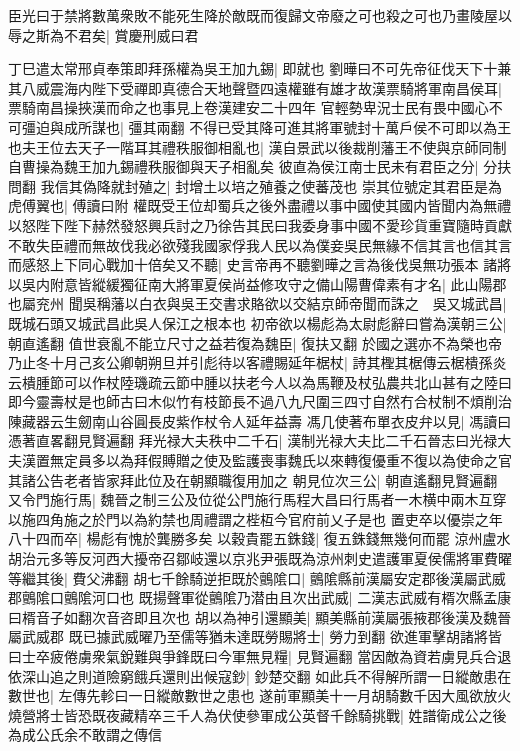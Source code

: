 臣光曰于禁將數萬衆敗不能死生降於敵既而復歸文帝廢之可也殺之可也乃畫陵屋以辱之斯為不君矣|{
	賞慶刑威曰君}


丁巳遣太常邢貞奉策即拜孫權為吳王加九錫|{
	即就也}
劉曄曰不可先帝征伐天下十兼其八威震海内陛下受禪即真德合天地聲暨四遠權雖有雄才故漢票騎將軍南昌侯耳|{
	票騎南昌操挾漢而命之也事見上卷漢建安二十四年}
官輕勢卑況士民有畏中國心不可彊迫與成所謀也|{
	彊其兩翻}
不得已受其降可進其將軍號封十萬戶侯不可即以為王也夫王位去天子一階耳其禮秩服御相亂也|{
	漢自景武以後裁削藩王不使與京師同制自曹操為魏王加九錫禮秩服御與天子相亂矣}
彼直為侯江南士民未有君臣之分|{
	分扶問翻}
我信其偽降就封殖之|{
	封增土以培之殖養之使蕃茂也}
崇其位號定其君臣是為虎傅翼也|{
	傅讀曰附}
權既受王位却蜀兵之後外盡禮以事中國使其國内皆聞内為無禮以怒陛下陛下赫然發怒興兵討之乃徐告其民曰我委身事中國不愛珍貨重寶隨時貢獻不敢失臣禮而無故伐我必欲殘我國家俘我人民以為僕妾吳民無緣不信其言也信其言而感怒上下同心戰加十倍矣又不聽|{
	史言帝再不聽劉曄之言為後伐吳無功張本}
諸將以吳内附意皆縱緩獨征南大將軍夏侯尚益修攻守之備山陽曹偉素有才名|{
	此山陽郡也屬兖州}
聞吳稱藩以白衣與吳王交書求賂欲以交結京師帝聞而誅之　吳又城武昌|{
	既城石頭又城武昌此吳人保江之根本也}
初帝欲以楊彪為太尉彪辭曰嘗為漢朝三公|{
	朝直遙翻}
值世衰亂不能立尺寸之益若復為魏臣|{
	復扶又翻}
於國之選亦不為榮也帝乃止冬十月己亥公卿朝朔旦并引彪待以客禮賜延年椐杖|{
	詩其檉其椐傳云椐樻孫炎云樻腫節可以作杖陸璣疏云節中腫以扶老今人以為馬鞭及杖弘農共北山甚有之陸曰即今靈壽杖是也師古曰木似竹有枝節長不過八九尺圍三四寸自然冇合杖制不煩削治陳藏器云生劒南山谷圓長皮紫作杖令人延年益壽}
馮几使著布單衣皮弁以見|{
	馮讀曰憑著直畧翻見賢遍翻}
拜光禄大夫秩中二千石|{
	漢制光禄大夫比二千石晉志曰光禄大夫漢置無定員多以為拜假賻贈之使及監護喪事魏氏以來轉復優重不復以為使命之官其諸公告老者皆家拜此位及在朝顯職復用加之}
朝見位次三公|{
	朝直遙翻見賢遍翻}
又令門施行馬|{
	魏晉之制三公及位從公門施行馬程大昌曰行馬者一木横中兩木互穿以施四角施之於門以為約禁也周禮謂之梐枑今官府前乂子是也}
置吏卒以優崇之年八十四而卒|{
	楊彪有愧於龔勝多矣}
以穀貴罷五銖錢|{
	復五銖錢無幾何而罷}
涼州盧水胡治元多等反河西大擾帝召鄒岐還以京兆尹張既為涼州刺史遣護軍夏侯儒將軍費曜等繼其後|{
	費父沸翻}
胡七千餘騎逆拒既於鸇隂口|{
	鸇隂縣前漢屬安定郡後漢屬武威郡鸇隂口鸇隂河口也}
既揚聲軍從鸇隂乃潜由且次出武威|{
	二漢志武威有楈次縣孟康曰楈音子如翻次音咨即且次也}
胡以為神引還顯美|{
	顯美縣前漢屬張掖郡後漢及魏晉屬武威郡}
既已據武威曜乃至儒等猶未達既勞賜將士|{
	勞力到翻}
欲進軍擊胡諸將皆曰士卒疲倦虜衆氣銳難與爭鋒既曰今軍無見糧|{
	見賢遍翻}
當因敵為資若虜見兵合退依深山追之則道險窮餓兵還則出候寇鈔|{
	鈔楚交翻}
如此兵不得解所謂一日縱敵患在數世也|{
	左傳先軫曰一日縱敵數世之患也}
遂前軍顯美十一月胡騎數千因大風欲放火燒營將士皆恐既夜藏精卒三千人為伏使參軍成公英督千餘騎挑戰|{
	姓譜衛成公之後為成公氏余不敢謂之傳信}
